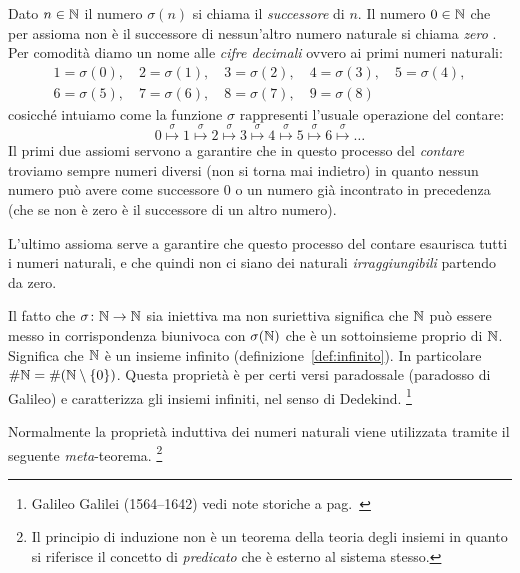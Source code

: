Dato $n\in {\mathbb N}$ il numero $\sigma(n)$ si chiama il \emph{successore}%
%
 di $n$.
Il numero $0\in {\mathbb N}$ che per assioma non è il successore di nessun'altro 
numero naturale si chiama \emph{zero}%
%
. 
Per comodità diamo un nome alle \emph{cifre decimali}%
%
ovvero ai primi numeri naturali:
\begin{equation}\label{eq:cifre}
\begin{gathered}
 1 = \sigma(0),\quad  
 2 = \sigma(1),\quad
 3 = \sigma(2),\quad 
 4 = \sigma(3),\quad
 5 = \sigma(4),\\ 
 6 = \sigma(5),\quad 
 7 = \sigma(6),\quad 
 8 = \sigma(7),\quad 
 9 = \sigma(8)
\end{gathered}
\end{equation}
 cosicché intuiamo come la funzione $\sigma$ rappresenti 
 l'usuale operazione del contare:
 \[
 0 \stackrel\sigma\mapsto 1 \stackrel\sigma\mapsto 2 \stackrel\sigma\mapsto 
 3 \stackrel\sigma\mapsto 4 \stackrel\sigma\mapsto 5 \stackrel\sigma\mapsto 
 6 \stackrel\sigma\mapsto \dots  
 \]
Il primi due assiomi servono a garantire che in questo processo del \emph{contare}%
%
troviamo sempre numeri diversi (non si torna mai indietro) in quanto nessun numero 
può avere come successore $0$ o un numero già incontrato in precedenza (che 
se non è zero è il successore di un altro numero).

L'ultimo assioma serve a garantire che questo processo del contare esaurisca tutti 
i numeri naturali, e che quindi non ci siano dei naturali \emph{irraggiungibili}
partendo da zero.

Il fatto che $\sigma\colon {\mathbb N}\to {\mathbb N}$ sia iniettiva ma non suriettiva 
significa che ${\mathbb N}$ può essere messo in corrispondenza biunivoca con 
$\sigma({\mathbb N})$ che è un sottoinsieme proprio di ${\mathbb N}$.
Significa che ${\mathbb N}$ è un insieme infinito (definizione~\ref{def:infinito}).
In particolare $\#{\mathbb N} = \#{\left( {\mathbb N} \setminus{\left\{ 0 \right\}} \right)}$.
Questa proprietà è per certi versi paradossale
(paradosso di Galileo)
%
%
e caratterizza gli 
insiemi infiniti, nel senso di Dedekind.%
\footnote{Galileo Galilei (1564--1642) vedi note storiche a pag.~\pageref{nota:Galileo}}%

Normalmente la proprietà induttiva dei numeri naturali viene utilizzata tramite 
il seguente \emph{meta}-teorema.
\footnote{%
Il principio di induzione non è un teorema della teoria degli insiemi 
in quanto si riferisce il concetto di \emph{predicato} che è esterno 
al sistema stesso.}

